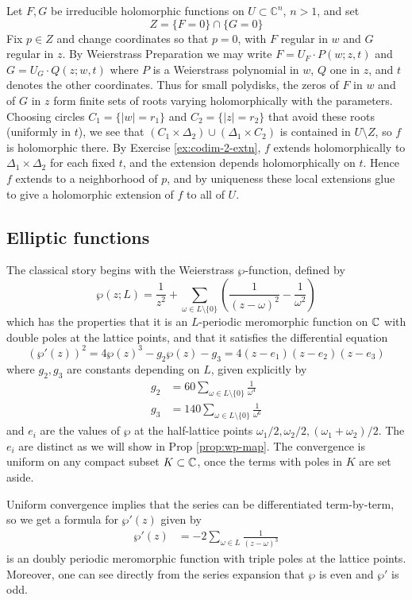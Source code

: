 \documentclass[12pt]{article}
\begin{document}
\begin{solution}
Let $F,G$ be irreducible holomorphic functions on $U\subset\mathbb{C}^n$, $n>1$, and set \[Z=\{F=0\}\cap\{G=0\}\] Fix $p\in Z$ and change coordinates so that $p=0$, with $F$ regular in $w$ and $G$ regular in $z$. By Weierstrass Preparation we may write $F=U_F\cdot P(w;z,t)$ and $G=U_G\cdot Q(z;w,t)$ where $P$ is a Weierstrass polynomial in $w$, $Q$ one in $z$, and $t$ denotes the other coordinates. Thus for small polydisks, the zeros of $F$ in $w$ and of $G$ in $z$ form finite sets of roots varying holomorphically with the parameters. Choosing circles $C_1=\{|w|=r_1\}$ and $C_2=\{|z|=r_2\}$ that avoid these roots (uniformly in $t$), we see that $(C_1\times \Delta_2)\cup (\Delta_1\times C_2)$ is contained in $U\setminus Z$, so $f$ is holomorphic there. By Exercise \ref{ex:codim-2-extn}, $f$ extends holomorphically to $\Delta_1\times \Delta_2$ for each fixed $t$, and the extension depends holomorphically on $t$. Hence $f$ extends to a neighborhood of $p$, and by uniqueness these local extensions glue to give a holomorphic extension of $f$ to all of $U$.
\end{solution}



\subsection{Elliptic functions}
The classical story begins with the Weierstrass $\wp$-function, defined by
\[\wp(z;L) = \frac{1}{z^2} + \sum_{\omega \in L\setminus\{0\}} \left(\frac{1}{(z-\omega)^2} - \frac{1}{\omega^2}\right)\]
which has the properties that it is an $L$-periodic meromorphic function on $\mathbb{C}$ with double poles at the lattice points, and that it satisfies the differential equation
\[(\wp'(z))^2 = 4\wp(z)^3 - g_2\wp(z) - g_3 = 4(z - e_1)(z - e_2)(z - e_3)\]
where $g_2,g_3$ are constants depending on $L$, given explicitly by \begin{align*}
    g_2 & = 60\sum_{\omega \in L\setminus\{0\}} \frac{1}{\omega^4} \\
    g_3 & = 140\sum_{\omega \in L\setminus\{0\}} \frac{1}{\omega^6}
\end{align*} and $e_i$ are the values of $\wp$ at the half-lattice points $\omega_1/2, \omega_2/2, (\omega_1+\omega_2)/2$. The $e_i$ are distinct as we will show in Prop \ref{prop:wp-map}.
The convergence is uniform on any compact subset $K \subset \mathbb{C}$, once the terms with poles in $K$ are set aside.

Uniform convergence implies that the series can be differentiated term-by-term, so we get a formula for $\wp'(z)$ given by \begin{align*}
    \wp'(z) & = -2\sum_{\omega \in L} \frac{1}{(z-\omega)^3}
\end{align*} is an doubly periodic meromorphic function with triple poles at the lattice points. Moreover, one can see directly from the series expansion that $\wp$ is even and $\wp'$ is odd.
\end{document}
